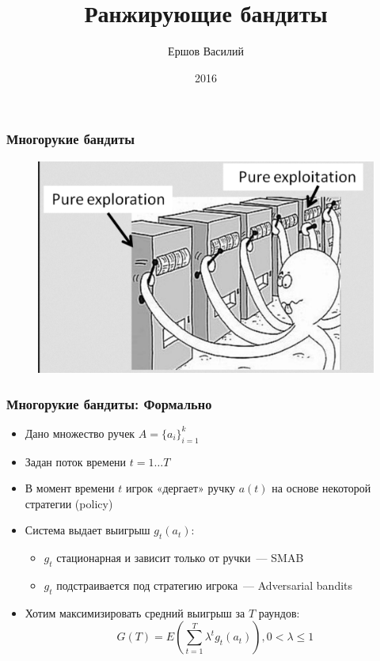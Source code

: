 \documentclass[xetex,mathserif,serif,table]{beamer}
\title %
{Ранжирующие бандиты}
\author{Ершов Василий}
\date %
{2016}
\begin{document}
\begin{frame}[plain]
\titlepage
\end{frame}

\begin{frame}
\frametitle{Многорукие бандиты}

\begin{figure}
  \centering
     \includegraphics[width=0.7\paperwidth]{img/bandit.png}
\end{figure}

\end{frame}

\begin{frame}
\frametitle{Многорукие бандиты: Формально}
\begin{itemize}
\item Дано множество ручек $A = \{ a_i \}_{i=1}^{k}$
\item Задан поток времени $t = 1…T$
\item В момент времени $t$ игрок «дергает» ручку $a(t)$ на основе некоторой стратегии (policy)
\item Система выдает выигрыш $g_t(a_t)$:
\begin{itemize}
  \item $g_t$ стационарная и зависит только от ручки — SMAB
  \item $g_t$ подстраивается под стратегию игрока — Adversarial bandits
\end{itemize}
\item Хотим максимизировать средний выигрыш за $T$ раундов:
$$G(T) = E\left( \sum\limits_{t=1}^{T} \lambda^{t}g_{t}(a_t)\right), 0 < \lambda \leq 1 $$
\end{itemize}

\end{frame}
\end{document}
